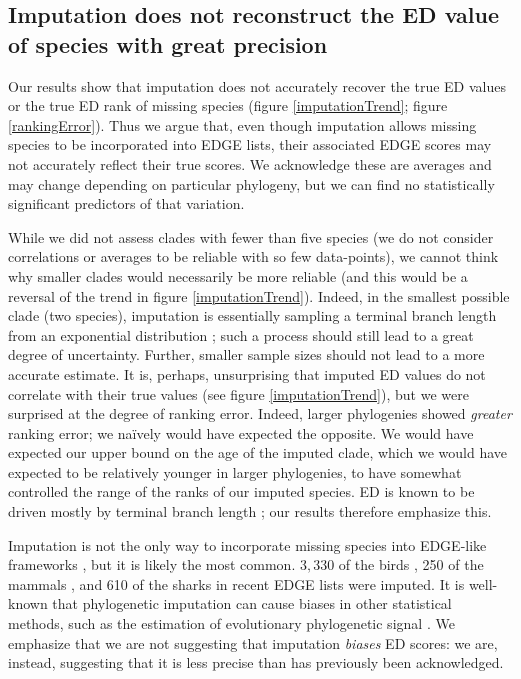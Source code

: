\documentclass[12pt,english]{article}
\begin{document}
\subsection*{Imputation does not reconstruct the ED value of species with great precision}
Our results show that imputation does not accurately recover the true ED values
or the true ED rank of missing species (figure \ref{imputationTrend}; figure
\ref{rankingError}). Thus we argue that, even though imputation allows missing
species to be incorporated into EDGE lists, their associated EDGE scores may not
accurately reflect their true scores. We acknowledge these are averages and may
change depending on particular phylogeny, but we can find no statistically
significant predictors of that variation.

While we did not assess clades with fewer than five species (we do not consider
correlations or averages to be reliable with so few data-points), we cannot
think why smaller clades would necessarily be more reliable (and this would be a
reversal of the trend in figure \ref{imputationTrend}). Indeed, in the smallest
possible clade (two species), imputation is essentially sampling a terminal
branch length from an exponential distribution \autocite{Kuhn2011}; such a
process should still lead to a great degree of uncertainty. Further, smaller
sample sizes should not lead to a more accurate estimate. It is, perhaps,
unsurprising that imputed ED values do not correlate with their true values (see
figure \ref{imputationTrend}), but we were surprised at the degree of ranking error.
Indeed, larger phylogenies showed \emph{greater} ranking error; we na\"{i}vely
would have expected the opposite. We would have expected our upper bound on the
age of the imputed clade, which we would have expected to be relatively younger
in larger phylogenies, to have somewhat controlled the range of the ranks of our
imputed species. ED is known to be driven mostly by terminal branch length
\autocite{Redding2008, Isaac2007, Steel2007}; our results therefore emphasize
this.

Imputation is not the only way to incorporate missing species into EDGE-like
frameworks \autocite{Gumbs2017, Collen2011}, but it is likely the most common.
$3,330$ of the birds \autocite[\textasciitilde30\%;][]{Jetz2014}, 250 of the mammals
\autocite[\textasciitilde 5.6\%;][]{Collen2011}, and 610 of the sharks
\autocite[\textasciitilde49\%;][]{Stein2018} in recent EDGE lists were imputed.
It is well-known that phylogenetic imputation can cause biases in other
statistical methods, such as the estimation of evolutionary phylogenetic signal
\autocite{Rabosky2014}. We emphasize that we are not suggesting that imputation
\emph{biases} ED scores: we are, instead, suggesting that it is less precise
than has previously been acknowledged.
\end{document}
